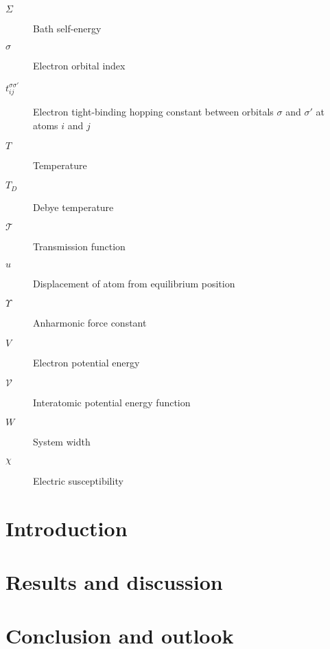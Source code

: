 \documentclass[dissertation,draft*]{aaltoseries}
\newcommand{\bb}{\mathbf}
\newcommand{\bu}{\bb{u}}
\begin{document}
\begin{description}
  \item[$\Sigma$] Bath self-energy
  \item[$\sigma$] Electron orbital index
  \item[$t_{ij}^{\sigma\sigma'}$] Electron tight-binding hopping constant between orbitals $\sigma$ and $\sigma'$ at atoms $i$ and $j$
  \item[$T$] Temperature
   \item[$T_D$] Debye temperature
   \item[$\mathcal{T}$] Transmission function
  \item[$u$] Displacement of atom from equilibrium position
  \item[$\Upsilon$] Anharmonic force constant
  \item[${V}$] Electron potential energy
  \item[$\mathcal{V}$] Interatomic potential energy function
  \item[$W$] System width
  \item[$\chi$] Electric susceptibility
\end{description}

\chapter{Introduction}
\setcounter{page}{1}




\chapter{Results and discussion}




\chapter{Conclusion and outlook}



\renewcommand{\bibname}{References}

%
{}

%
%




\end{document}
